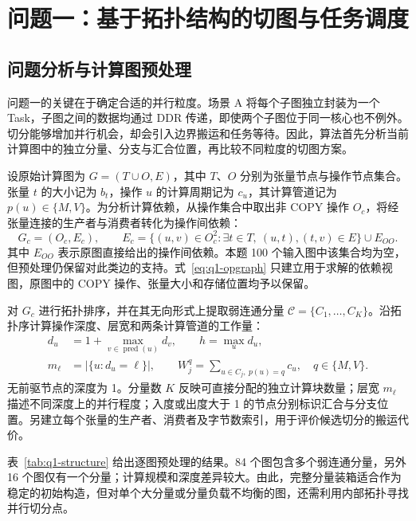 \section{问题一：基于拓扑结构的切图与任务调度}

\subsection{问题分析与计算图预处理}
问题一的关键在于确定合适的并行粒度。场景 A 将每个子图独立封装为一个 Task，子图之间的数据均通过 DDR 传递，即使两个子图位于同一核心也不例外。切分能够增加并行机会，却会引入边界搬运和任务等待。因此，算法首先分析当前计算图中的独立分量、分支与汇合位置，再比较不同粒度的切图方案。

设原始计算图为 $G=(T\cup O,E)$，其中 $T$、$O$ 分别为张量节点与操作节点集合。张量 $t$ 的大小记为 $b_t$，操作 $u$ 的计算周期记为 $c_u$，其计算管道记为 $p(u)\in\{M,V\}$。为分析计算依赖，从操作集合中取出非 COPY 操作 $O_c$，将经张量连接的生产者与消费者转化为操作间依赖：
\begin{equation}
G_c=(O_c,E_c),\qquad
E_c=\{(u,v)\in O_c^2:\exists t\in T,\ (u,t),(t,v)\in E\}\cup E_{OO}.
\label{eq:q1-opgraph}
\end{equation}
其中 $E_{OO}$ 表示原图直接给出的操作间依赖。本题 100 个输入图中该集合均为空，但预处理仍保留对此类边的支持。式~\eqref{eq:q1-opgraph} 只建立用于求解的依赖视图，原图中的 COPY 操作、张量大小和存储位置均予以保留。

对 $G_c$ 进行拓扑排序，并在其无向形式上提取弱连通分量 $\mathcal C=\{C_1,\ldots,C_K\}$。沿拓扑序计算操作深度、层宽和两条计算管道的工作量：
\begin{equation}
\begin{aligned}
d_u&=1+\max_{v\in\operatorname{pred}(u)}d_v,\qquad h=\max_u d_u,\\
m_\ell&=|\{u:d_u=\ell\}|,\qquad
W_j^q=\sum_{u\in C_j,\ p(u)=q}c_u,\quad q\in\{M,V\}.
\end{aligned}
\label{eq:q1-features}
\end{equation}
无前驱节点的深度为 1。分量数 $K$ 反映可直接分配的独立计算块数量；层宽 $m_\ell$ 描述不同深度上的并行程度；入度或出度大于 1 的节点分别标识汇合与分支位置。另建立每个张量的生产者、消费者及字节数索引，用于评价候选切分的搬运代价。

表~\ref{tab:q1-structure} 给出逐图预处理的结果。84 个图包含多个弱连通分量，另外 16 个图仅有一个分量；计算规模和深度差异较大。由此，完整分量装箱适合作为稳定的初始构造，但对单个大分量或分量负载不均衡的图，还需利用内部拓扑寻找并行切分点。

